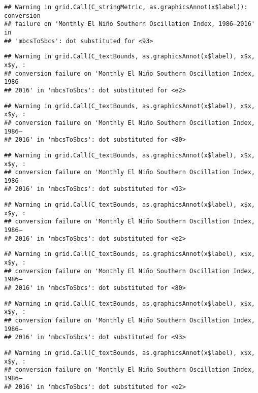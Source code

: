 \documentclass[]{article}
\theoremstyle{definition}
\theoremstyle{definition}
\theoremstyle{definition}
\theoremstyle{remark}
\begin{document}
\begin{verbatim}
## Warning in grid.Call(C_stringMetric, as.graphicsAnnot(x$label)): conversion
## failure on 'Monthly El Niño Southern Oscillation Index, 1986–2016' in
## 'mbcsToSbcs': dot substituted for <93>
\end{verbatim}

\begin{verbatim}
## Warning in grid.Call(C_textBounds, as.graphicsAnnot(x$label), x$x, x$y, :
## conversion failure on 'Monthly El Niño Southern Oscillation Index, 1986–
## 2016' in 'mbcsToSbcs': dot substituted for <e2>
\end{verbatim}

\begin{verbatim}
## Warning in grid.Call(C_textBounds, as.graphicsAnnot(x$label), x$x, x$y, :
## conversion failure on 'Monthly El Niño Southern Oscillation Index, 1986–
## 2016' in 'mbcsToSbcs': dot substituted for <80>
\end{verbatim}

\begin{verbatim}
## Warning in grid.Call(C_textBounds, as.graphicsAnnot(x$label), x$x, x$y, :
## conversion failure on 'Monthly El Niño Southern Oscillation Index, 1986–
## 2016' in 'mbcsToSbcs': dot substituted for <93>
\end{verbatim}

\begin{verbatim}
## Warning in grid.Call(C_textBounds, as.graphicsAnnot(x$label), x$x, x$y, :
## conversion failure on 'Monthly El Niño Southern Oscillation Index, 1986–
## 2016' in 'mbcsToSbcs': dot substituted for <e2>
\end{verbatim}

\begin{verbatim}
## Warning in grid.Call(C_textBounds, as.graphicsAnnot(x$label), x$x, x$y, :
## conversion failure on 'Monthly El Niño Southern Oscillation Index, 1986–
## 2016' in 'mbcsToSbcs': dot substituted for <80>
\end{verbatim}

\begin{verbatim}
## Warning in grid.Call(C_textBounds, as.graphicsAnnot(x$label), x$x, x$y, :
## conversion failure on 'Monthly El Niño Southern Oscillation Index, 1986–
## 2016' in 'mbcsToSbcs': dot substituted for <93>
\end{verbatim}

\begin{verbatim}
## Warning in grid.Call(C_textBounds, as.graphicsAnnot(x$label), x$x, x$y, :
## conversion failure on 'Monthly El Niño Southern Oscillation Index, 1986–
## 2016' in 'mbcsToSbcs': dot substituted for <e2>
\end{verbatim}
\end{document}
